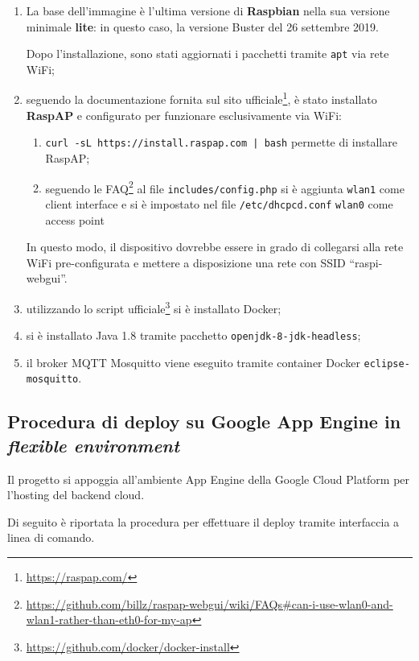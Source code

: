 \begin{enumerate}
  \item
    La base dell'immagine è l'ultima versione di \textbf{Raspbian} nella sua versione minimale \textbf{lite}:
    in questo caso, la versione Buster del 26 settembre 2019.

    Dopo l'installazione, sono stati aggiornati i pacchetti tramite \texttt{apt} via rete WiFi;
  \item
    seguendo la documentazione fornita sul sito ufficiale\footnote{\url{https://raspap.com/}},
    è stato installato \textbf{RaspAP} e configurato per funzionare esclusivamente via WiFi:
    \begin{enumerate}
      \item
        \texttt{curl -sL https://install.raspap.com | bash} permette di installare RaspAP\@;
      \item
        seguendo le FAQ\footnote{\url{https://github.com/billz/raspap-webgui/wiki/FAQs\#can-i-use-wlan0-and-wlan1-rather-than-eth0-for-my-ap}}
        al file \texttt{includes/config.php} si è aggiunta \texttt{wlan1} come client interface e si è impostato nel file \texttt{/etc/dhcpcd.conf}
        \texttt{wlan0} come access point
    \end{enumerate}
    In questo modo, il dispositivo dovrebbe essere in grado di collegarsi alla rete WiFi pre-configurata e mettere a disposizione una rete con SSID ``raspi-webgui''.
  \item
    utilizzando lo script ufficiale\footnote{\url{https://github.com/docker/docker-install}} si è installato Docker;
  \item
    si è installato Java 1.8 tramite pacchetto \texttt{openjdk-8-jdk-headless};
  \item
    il broker MQTT Mosquitto viene eseguito tramite container Docker \texttt{eclipse-mosquitto}.
\end{enumerate}

\subsection{Procedura di deploy su Google App Engine in \emph{flexible environment}}\label{app:gcp}

Il progetto si appoggia all'ambiente App Engine della Google Cloud Platform per l'hosting del backend cloud.

Di seguito è riportata la procedura per effettuare il deploy tramite interfaccia a linea di comando.

